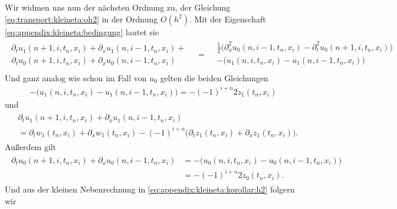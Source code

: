 Wir widmen uns nun der nächsten Ordnung zu, der Gleichung \eqref{eq:transport:kleineta:oh2} in der Ordnung $O(h^2)$.
Mit der Eigenschaft \eqref{eq:appendix:kleineta:bedingung} lautet sie
{\small
\begin{align}\label{eq:ke:oh2}
\begin{split}
\partial_t u_1(n+1, i, t_n, x_i) + \partial_x u_1(n, i-1, t_n, x_i) +\\
\partial_t u_0(n+1, i, t_n, x_i) + \partial_x u_0(n, i-1, t_n, x_i)
\end{split}
&=
\begin{split}
&\frac{1}{2} \bigl( \partial^2_x u_0(n, i-1, t_n, x_i) - \partial^2_t u_0(n+1,i, t_n, x_i)\bigr)\\
&- \bigl( u_1(n, i, t_n, x_i) - u_1(n, i-1, t_n, x_i) \bigr)\\
\end{split}
\end{align}
}
Und ganz analog wie schon im Fall von $u_0$ gelten die beiden Gleichungen
\begin{align} \label{eq:ke:glg1}
- \bigl( u_1(n, i, t_n, x_i) - u_1(n, i-1, t_n, x_i) \bigr) = - (-1)^{i+n} 2 z_1(t_n,x_i) 
\end{align}
und
\begin{align}
\begin{split}
&\partial_t u_1(n+1, i, t_n, x_i) + \partial_x u_1(n, i-1, t_n, x_i)\\
&=\partial_t w_1(t_n,x_i) + \partial_x w_1(t_n,x_i) - (-1)^{i+n} \bigl( \partial_t z_1(t_n,x_i) + \partial_x z_1(t_n,x_i) \bigr).
\end{split}
\end{align}
Außerdem gilt
\begin{align}
\begin{split}
\partial_t u_0(n+1, i, t_n, x_i) + \partial_x u_0(n, i-1, t_n, x_i)
&= - \bigl( u_0(n, i, t_n, x_i) - u_0(n, i-1, t_n, x_i) \bigr)\\
&= - (-1)^{i+n} 2 z_0(t_n,x_i).
\end{split}
\end{align}
Und aus der kleinen Nebenrechnung in \eqref{eq:appendix:kleineta:korollar:h2} folgern wir 
